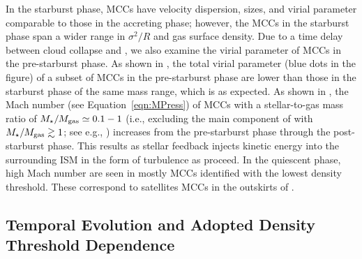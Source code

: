 \IfFileExists{emulateapjlegacy.cls}{\documentclass[iop]{emulateapjlegacy}}{\documentclass[iop]{emulateapj}}
\begin{document}
In the starburst phase, MCCs have velocity dispersion, sizes,
and virial parameter comparable to those in the accreting phase; however, the MCCs in the starburst phase span 
a wider range in $\sigma^2/R$ and gas surface density. 
Due to a time delay between cloud collapse and \SF, we also examine the virial parameter of MCCs in the pre-starburst phase. 
As shown in , the total virial parameter (blue dots in the figure) 
of a subset of MCCs in the pre-starburst phase are lower than those in the starburst phase of the same mass range, which is as expected.
As shown in , the Mach number (see Equation~\ref{eqn:MPress}) 
of MCCs with a stellar-to-gas mass ratio of $M_\star/M_{\rm gas} \simeq 0.1 - 1$ 
(i.e., excluding the main component of \flower with $M_\star/M_{\rm gas} \gtrsim 1$; see e.g., )
increases from the pre-starburst phase through the post-starburst phase. 
This results as stellar feedback injects kinetic energy into the surrounding ISM in the form of turbulence as \SF proceed.
In the quiescent phase, high Mach number are seen in mostly MCCs identified with the lowest density threshold. These 
correspond to satellites MCCs in the outskirts of \flower.


\subsection{Temporal Evolution and Adopted Density Threshold Dependence}\label{sec:ncut}
\end{document}
